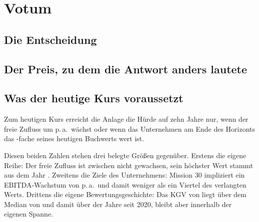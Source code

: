 \section{Votum}
\label{sec:votum}

\subsection{Die Entscheidung}



\subsection{Der Preis, zu dem die Antwort anders lautete}

\schwellentabelle


\subsection{Was der heutige Kurs voraussetzt}

\umkehrtabellen

Zum heutigen Kurs erreicht die Anlage die H\"urde auf zehn Jahre nur, wenn der freie
Zufluss um \WachstumMEDZehn{} p.\,a.\ w\"achst oder wenn das Unternehmen am Ende des
Horizonts das \EndwertMEDZehn-fache seines heutigen Buchwerts wert ist.

Diesen beiden Zahlen stehen drei belegte Gr\"o{\ss}en gegen\"uber. Erstens die eigene
Reihe: Der freie Zufluss ist zwischen \FcfJahre{} nicht gewachsen, sein h\"ochster Wert
stammt aus dem Jahr \FcfMaxJahr. Zweitens die Ziele des Unternehmens: Mission 30
impliziert ein EBITDA-Wachstum von \MissionImplizit{} p.\,a.\ und damit weniger als ein
Viertel des verlangten Werts. Drittens die eigene Bewertungsgeschichte: Das KGV von
\KgvHeute{} liegt \"uber dem Median von \KgvMedian{} und damit \"uber
\Pz{\KgvRang} der Jahre seit 2020, bleibt aber innerhalb der eigenen Spanne.

